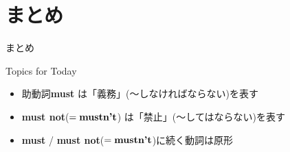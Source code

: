 \documentclass[aspectratio=169,xcolor={dvipsnames,table}]{beamer}
\begin{document}
\section{まとめ}
\begin{frame}[plain]{まとめ}
 \Large

\begin{exampleblock}{Topics for Today}
\small
\begin{itemize}[square]
 \item<2->  助動詞{\bfseries must} は「義務」(〜しなければならない)を表す%
\hfill{}{\scriptsize {}}
 \item<3->  {\bfseries must not}($=\text{\bfseries mustn't}$) は「禁止」(〜してはならない)を表す%
\hfill{}{\scriptsize {}}
 \item<4->  {\bfseries must} / {\bfseries must not}($=\text{\bfseries mustn't}$)に続く動詞は原形
\end{itemize}

\end{exampleblock}

\vfill


\end{frame}
\end{document}
